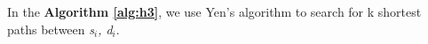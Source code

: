 In the \textbf{Algorithm \ref{alg:h3}}, we use Yen's algorithm to search for k shortest paths between \textit{s$_i$, d$_i$}.


